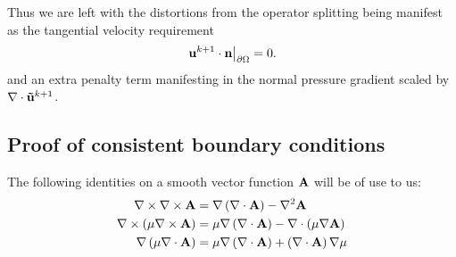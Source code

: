 \documentclass[letterpaper]{erdc}
\begin{document}
 Thus we are left with the distortions from the operator splitting being manifest as the tangential velocity requirement
\begin{equation}
  \left.\textbf{u}^{k+1}\cdot\textbf{n}\right|_{\partial\Omega} = 0.
\end{equation}
and an extra penalty term manifesting in the normal pressure gradient scaled by $\nabla\cdot\mathbf{\tilde{u}}^{k+1}$.  



%
%
\subsection{Proof of consistent boundary conditions}
The following identities on a smooth vector function $\mathbf{A}$ will be of use to us:
\begin{align}
  \nabla\times\nabla\times \mathbf{A} &= \nabla\left( \nabla\cdot \mathbf{A}\right) - \nabla^2 \mathbf{A}\label{eqn:curlcurlidentity}\\
  \nabla\times\left( \mu \nabla\times \mathbf{A} \right) &= \mu\nabla\left(\nabla\cdot \mathbf{A}\right) - \nabla\cdot\left(\mu \nabla \mathbf{A} \right)\label{eqn:curlmucurlidentity}\\
  \nabla\left( \mu \nabla\cdot \mathbf{A}\right) &= \mu\nabla\left(\nabla\cdot \mathbf{A}\right) + \left( \nabla\cdot \mathbf{A}\right)\nabla\mu\label{eqn:gradmudividentity}
\end{align}
\end{document}
